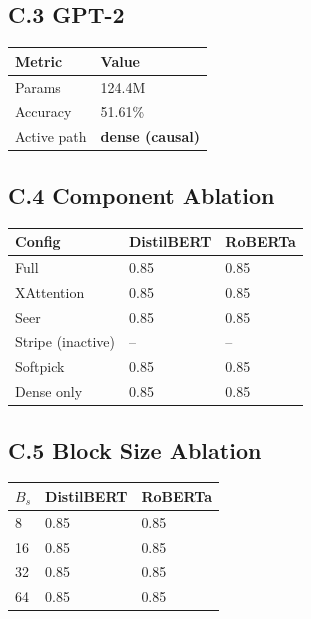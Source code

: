 \subsection{C.3 GPT-2}

\begin{table}[H]
\centering
\small
\begin{tabular}{ll}
\toprule
\textbf{Metric} & \textbf{Value} \\
\midrule
Params & 124.4M \\
Accuracy & 51.61\% \\
Active path & \textbf{dense (causal)} \\
\bottomrule
\end{tabular}
\end{table}

\subsection{C.4 Component Ablation}

\begin{table}[H]
\centering
\small
\begin{tabular}{lll}
\toprule
\textbf{Config} & \textbf{DistilBERT} & \textbf{RoBERTa} \\
\midrule
Full & 0.85 & 0.85 \\
XAttention & 0.85 & 0.85 \\
Seer & 0.85 & 0.85 \\
Stripe (inactive) & -- & -- \\
Softpick & 0.85 & 0.85 \\
Dense only & 0.85 & 0.85 \\
\bottomrule
\end{tabular}
\end{table}

\subsection{C.5 Block Size Ablation}

\begin{table}[H]
\centering
\small
\begin{tabular}{lll}
\toprule
\textbf{$B_s$} & \textbf{DistilBERT} & \textbf{RoBERTa} \\
\midrule
8 & 0.85 & 0.85 \\
16 & 0.85 & 0.85 \\
32 & 0.85 & 0.85 \\
64 & 0.85 & 0.85 \\
\bottomrule
\end{tabular}
\end{table}

